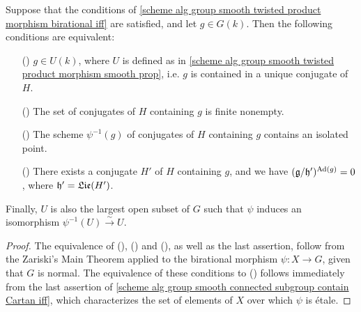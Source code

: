 \begin{corollary}\label{scheme alg group smooth conjugates containing g unique iff}
Suppose that the conditions of \cref{scheme alg group smooth twisted product morphism birational iff} are satisfied, and let $g\in G(k)$. Then the following conditions are equivalent:
\begin{enumerate}
    \item[(\rmnum{1})] $g\in U(k)$, where $U$ is defined as in \cref{scheme alg group smooth twisted product morphism smooth prop}, i.e. $g$ is contained in a unique conjugate of $H$.
    \item[(\rmnum{2})] The set of conjugates of $H$ containing $g$ is finite nonempty.
    \item[(\rmnum{3})] The scheme $\psi^{-1}(g)$ of conjugates of $H$ containing $g$ contains an isolated point.
    \item[(\rmnum{4})] There exists a conjugate $H'$ of $H$ containing $g$, and we have $(\mathfrak{g}/\mathfrak{h}')^{\mathrm{Ad}(g)}=0$, where $\mathfrak{h}'=\mathfrak{Lie}(H')$.
\end{enumerate}
Finally, $U$ is also the largest open subset of $G$ such that $\psi$ induces an isomorphism $\psi^{-1}(U)\stackrel{\sim}{\to}U$.
\end{corollary}
\begin{proof}
The equivalence of (), () and (), as well as the last assertion, follow from the Zariski's Main Theorem applied to the birational morphism $\psi:X\to G$, given that $G$ is normal. The equivalence of these conditions to () follows immediately from the last assertion of \cref{scheme alg group smooth connected subgroup contain Cartan iff}, which characterizes the set of elements of $X$ over which $\psi$ is \'etale.
\end{proof}

